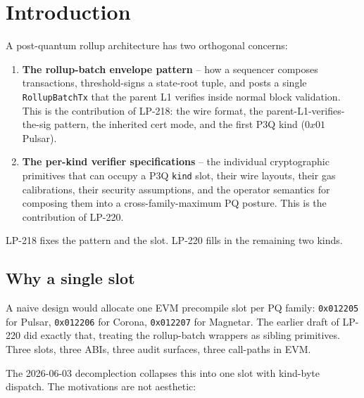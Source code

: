\section{Introduction}

A post-quantum rollup architecture has two orthogonal concerns:

\begin{enumerate}[leftmargin=2em,nosep]
\item \textbf{The rollup-batch envelope pattern} -- how a sequencer
  composes transactions, threshold-signs a state-root tuple, and
  posts a single \texttt{RollupBatchTx} that the parent L1
  verifies inside normal block validation. This is the
  contribution of LP-218: the wire format, the
  parent-L1-verifies-the-sig pattern, the inherited cert mode,
  and the first P3Q kind ($0x01$ Pulsar).
\item \textbf{The per-kind verifier specifications} -- the
  individual cryptographic primitives that can occupy a P3Q
  \texttt{kind} slot, their wire layouts, their gas calibrations,
  their security assumptions, and the operator semantics for
  composing them into a cross-family-maximum PQ posture. This is
  the contribution of LP-220.
\end{enumerate}

LP-218 fixes the pattern and the slot. LP-220 fills in the
remaining two kinds.

\subsection{Why a single slot}

A naive design would allocate one EVM precompile slot per PQ
family: \texttt{0x012205} for Pulsar, \texttt{0x012206} for
Corona, \texttt{0x012207} for Magnetar. The earlier draft of
LP-220 did exactly that, treating the rollup-batch wrappers as
sibling primitives. Three slots, three ABIs, three audit
surfaces, three call-paths in EVM.

The 2026-06-03 decomplection collapses this into one slot with
kind-byte dispatch. The motivations are not aesthetic:

